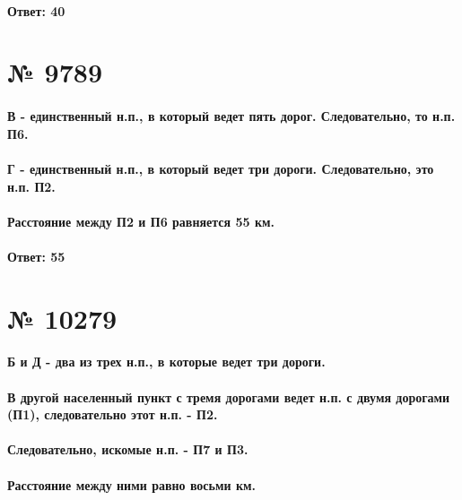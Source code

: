 \documentclass[11pt]{article} %
\begin{document}
\paragraph{Ответ: \textbf{40}}

\section{№ \textbf{9789}}

\paragraph{В - единственный н.п., в который ведет пять дорог. Следовательно, то н.п. П6.}

\paragraph{Г - единственный н.п., в который ведет три дороги. Следовательно, это н.п. П2.}

\paragraph{Расстояние между П2 и П6 равняется 55 км.}

\paragraph{Ответ: \textbf{55}}

\section{№ \textbf{10279}}

\paragraph{Б и Д - два из трех н.п., в которые ведет три дороги.}

\paragraph{В другой населенный пункт с тремя дорогами ведет н.п. с двумя дорогами (П1), следовательно этот н.п. - П2.}

\paragraph{Следовательно, искомые н.п. - П7 и П3.}

\paragraph{Расстояние между ними равно восьми км.}
\end{document}
